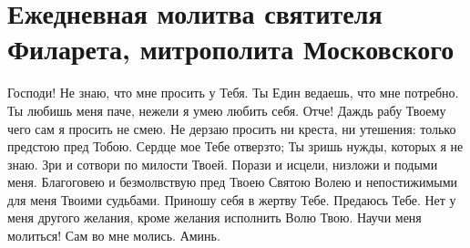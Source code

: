 \section{Ежедневная молитва святителя Филарета, митрополита Московского}\begin{mymulticols}
 
Господи! Не знаю, что мне просить у Тебя. Ты Един ведаешь, что мне потребно. Ты любишь меня паче, нежели я умею любить себя. Отче! Даждь рабу Твоему чего сам я просить не смею. Не дерзаю просить ни креста, ни утешения: только предстою пред Тобою. Сердце мое Тебе отверзто; Ты зришь нужды, которых я не знаю. Зри и сотвори по милости Твоей. Порази и исцели, низложи и подыми меня. Благоговею и безмолвствую пред Твоею Святою Волею и непостижимыми для меня Твоими судьбами. Приношу себя в жертву Тебе. Предаюсь Тебе. Нет у меня другого желания, кроме желания исполнить Волю Твою. Научи меня молиться! Сам во мне молись. Аминь.

\end{mymulticols}

